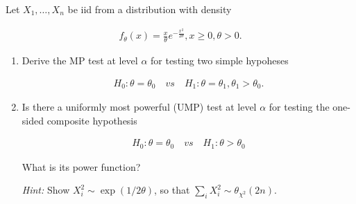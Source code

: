 
\begin{exercise}

Let $X_1, \dots, X_n$ be iid from a distribution with density

\begin{align*}
    f_\theta(x) = \frac{x}{\theta} e^{-\frac{x^2}{2 \theta}},
    x \geq 0,
    \theta > 0.
\end{align*}

\begin{enumerate}[label = (\alph*)]

    \item Derive the MP test at level $\alpha$ for testing two simple hypoheses
    
    \begin{align*}
        H_0: \theta = \theta_0
        \quad
        \textit{vs}
        \quad
        H_1: \theta = \theta_1, \theta_1 > \theta_0.
    \end{align*}

    \item Is there a uniformly most powerful (UMP) test at level $\alpha$ for testing the one-sided composite hypothesis
    
    \begin{align*}
        H_0: \theta = \theta_0
        \quad
        \textit{vs}
        \quad
        H_1: \theta > \theta_0
    \end{align*}

    What is its power function?

    \textit{Hint:}
    Show $X_i^2 \sim \exp(1 / 2 \theta)$, so that $\sum_i X_i^2 \sim \theta_{\chi^2}(2 n)$.

\end{enumerate}

\end{exercise}


